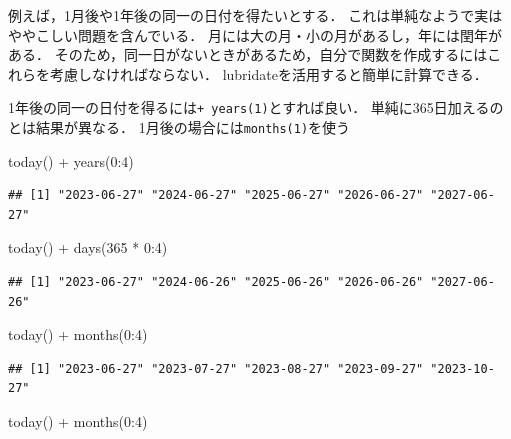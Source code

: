 \documentclass[
]{article}
\newenvironment{Shaded}{\begin{snugshade}}{\end{snugshade}}
\newcommand{\DecValTok}[1]{\textcolor[rgb]{0.00,0.00,0.81}{#1}}
\newcommand{\FunctionTok}[1]{\textcolor[rgb]{0.00,0.00,0.00}{#1}}
\newcommand{\NormalTok}[1]{#1}
\newcommand{\SpecialCharTok}[1]{\textcolor[rgb]{0.00,0.00,0.00}{#1}}
\begin{document}
例えば，1月後や1年後の同一の日付を得たいとする．
これは単純なようで実はややこしい問題を含んでいる．
月には大の月・小の月があるし，年には閏年がある．
そのため，同一日がないときがあるため，自分で関数を作成するにはこれらを考慮しなければならない．
lubridateを活用すると簡単に計算できる．

1年後の同一の日付を得るには\texttt{+\ years(1)}とすれば良い．
単純に365日加えるのとは結果が異なる．
1月後の場合には\texttt{months(1)}を使う

\begin{Shaded}
\begin{Highlighting}[]
\FunctionTok{today}\NormalTok{() }\SpecialCharTok{+} \FunctionTok{years}\NormalTok{(}\DecValTok{0}\SpecialCharTok{:}\DecValTok{4}\NormalTok{)}
\end{Highlighting}
\end{Shaded}

\begin{verbatim}
## [1] "2023-06-27" "2024-06-27" "2025-06-27" "2026-06-27" "2027-06-27"
\end{verbatim}

\begin{Shaded}
\begin{Highlighting}[]
\FunctionTok{today}\NormalTok{() }\SpecialCharTok{+} \FunctionTok{days}\NormalTok{(}\DecValTok{365} \SpecialCharTok{*} \DecValTok{0}\SpecialCharTok{:}\DecValTok{4}\NormalTok{)}
\end{Highlighting}
\end{Shaded}

\begin{verbatim}
## [1] "2023-06-27" "2024-06-26" "2025-06-26" "2026-06-26" "2027-06-26"
\end{verbatim}

\begin{Shaded}
\begin{Highlighting}[]
\FunctionTok{today}\NormalTok{() }\SpecialCharTok{+} \FunctionTok{months}\NormalTok{(}\DecValTok{0}\SpecialCharTok{:}\DecValTok{4}\NormalTok{)}
\end{Highlighting}
\end{Shaded}

\begin{verbatim}
## [1] "2023-06-27" "2023-07-27" "2023-08-27" "2023-09-27" "2023-10-27"
\end{verbatim}

\begin{Shaded}
\begin{Highlighting}[]
\FunctionTok{today}\NormalTok{() }\SpecialCharTok{+} \FunctionTok{months}\NormalTok{(}\DecValTok{0}\SpecialCharTok{:}\DecValTok{4}\NormalTok{)}
\end{Highlighting}
\end{Shaded}
\end{document}
